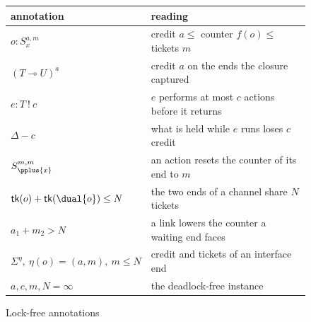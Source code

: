 \begin{figure}[tb]
  \small
  \begin{tabular}{@{}l@{\qquad}l@{}}
    \toprule
    annotation & reading \\
    \midrule
    $o : S_x^{a,m}$ & credit $a \leq$ counter $f(o) \leq$ tickets $m$ \\
    $(T \multimap U)^{a}$ & credit $a$ on the ends the closure captured \\
    $e : T\ !\ c$ & $e$ performs at most $c$ actions before it returns \\
    $\Delta - c$ & what is held while $e$ runs loses $c$ credit \\
    $S_{\pplus{x}}^{m,m}$ & an action resets the counter of its end to $m$ \\
    $\mathsf{tk}(o) + \mathsf{tk}(\dual{o}) \leq N$ & the two ends of a channel share $N$ tickets \\
    $a_1 + m_2 > N$ & a link lowers the counter a waiting end faces \\
    $\Sigma^{\eta},\ \eta(o) = (a, m),\ m \leq N$ & credit and tickets of an interface end \\
    $a, c, m, N = \infty$ & the deadlock-free instance \\
    \bottomrule
  \end{tabular}
  \caption{Lock-free annotations}
  \label{fig:lf-counters}
\end{figure}
